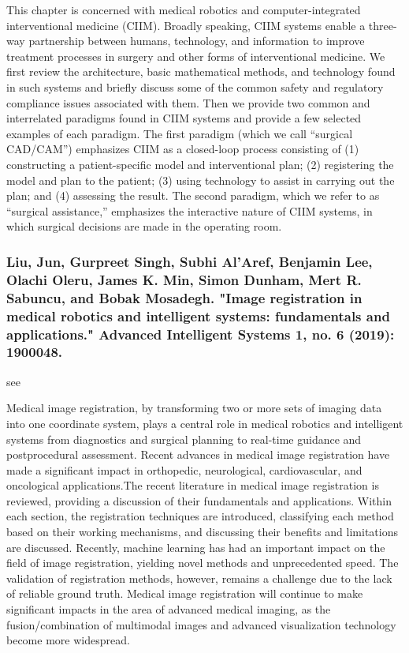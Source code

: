\documentclass[conference]{IEEEtran}
\begin{document}
This chapter is concerned with medical robotics and computer-integrated interventional medicine (CIIM). Broadly speaking, CIIM systems enable a three-way partnership between humans, technology, and information to improve treatment processes in surgery and other forms of interventional medicine. We first review the architecture, basic mathematical methods, and technology found in such systems and briefly discuss some of the common safety and regulatory compliance issues associated with them. Then we provide two common and interrelated paradigms found in CIIM systems and provide a few selected examples of each paradigm. The first paradigm (which we call “surgical CAD/CAM”) emphasizes CIIM as a closed-loop process consisting of (1) constructing a patient-specific model and interventional plan; (2) registering the model and plan to the patient; (3) using technology to assist in carrying out the plan; and (4) assessing the result. The second paradigm, which we refer to as “surgical assistance,” emphasizes the interactive nature of CIIM systems, in which surgical decisions are made in the operating room.

\medskip
\subsubsection{Liu, Jun, Gurpreet Singh, Subhi Al'Aref, Benjamin Lee, Olachi Oleru, James K. Min, Simon Dunham, Mert R. Sabuncu, and Bobak Mosadegh. "Image registration in medical robotics and intelligent systems: fundamentals and applications." Advanced Intelligent Systems 1, no. 6 (2019): 1900048.}
see \cite{liu2019image}

Medical image registration, by transforming two or more sets of imaging data into one coordinate system, plays a central role in medical robotics and intelligent systems from diagnostics and surgical planning to real-time guidance and postprocedural assessment. Recent advances in medical image registration have made a significant impact in orthopedic, neurological, cardiovascular, and oncological applications.The recent literature in medical image registration is reviewed, providing a discussion of their fundamentals and applications. Within each section, the registration techniques are introduced, classifying each method based on their working mechanisms, and discussing their benefits and limitations are discussed. Recently, machine learning has had an important impact on the field of image registration, yielding novel methods and unprecedented speed. The validation of registration methods, however, remains a challenge due to the lack of reliable ground truth. Medical image registration will continue to make significant impacts in the area of advanced medical imaging, as the fusion/combination of multimodal images and advanced visualization technology become more widespread.
\end{document}
